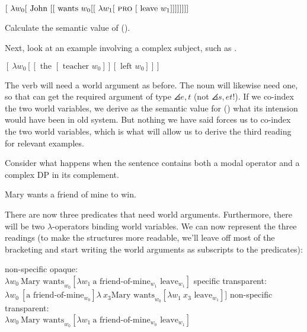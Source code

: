 \ex $[\ \lambda w_{0} [ \mbox{ John } [ [ \mbox{ wants } w_{0} [ [\ \lambda w_{1} [ \mbox{ \textsc{pro} } [ \mbox{ leave } w_{1} ]]]]]]]]$ \xe
 
\begin{exercise}
	Calculate the semantic value of (\lastx). \eex
\end{exercise}

Next, look at an example involving a complex subject, such as .

\ex $[\ \lambda w_{0} [ [ \mbox{ the } [ \mbox{ teacher } w_{0} ]] [ \mbox{ left } w_{0} ]]]$ \xe

The verb will need a world argument as before. The noun  will likewise need one, so that  can get the required argument of type $\angles{e,t}$ (not $\angles{s,et}$!). If we co-index the two world variables, we derive as the semantic value for (\lastx) what its intension would have been in old system. But nothing we have said forces us to co-index the two world variables, which is what will allow us to derive the third reading for relevant examples.

Consider what happens when the sentence contains both a modal operator and a complex DP in its complement.

\ex \label{fom} Mary wants a friend of mine to win. \xe

There are now three predicates that need world arguments. Furthermore, there will be two $\lambda$-operators binding world variables. We can now represent the three readings (to make the structures more readable, we'll leave off most of the bracketing and start writing the world arguments as subscripts to the predicates):

\pex
\a non-specific opaque:\\
$\lambda w_{0}\ \mbox{Mary wants}_{w_{0}} [ \lambda w_{1}\ \mbox{a friend-of-mine}_{w_{1}} \mbox{ leave}_{w_{1}} ]$ 
\a specific transparent:\\
$\lambda w_{0}\ [ \mbox{a friend-of-mine}_{w_{0}} ] \lambda\ x_{3} \mbox{Mary wants}_{w_{0}} [ \lambda w_{1}\ x_{3} \mbox{ leave}_{w_{1}} ]]$ 
\a non-specific transparent:\\
$\lambda w_{0}\ \mbox{Mary wants}_{w_{0}} [ \lambda w_{1}\ \mbox{a friend-of-mine}_{w_{0}} \mbox{ leave}_{w_{1}} ]$
\xe

